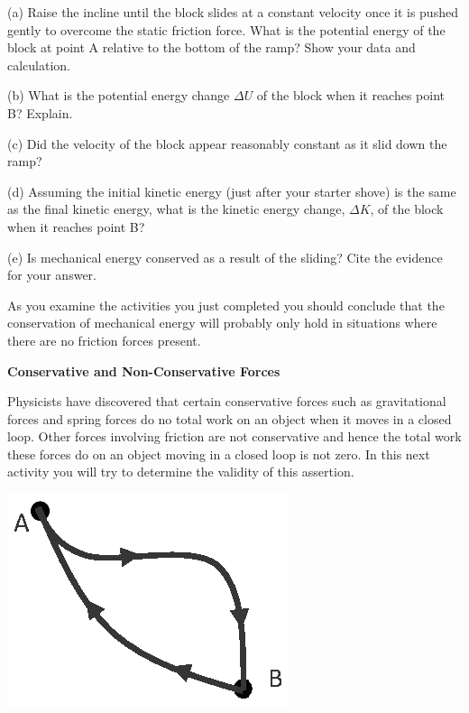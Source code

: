 (a) Raise the incline until the block slides at a constant velocity once it
is pushed gently to overcome the static friction force. What is the potential
energy of the block at point A relative to the bottom of the ramp? Show your
data and calculation.
\answerspace{35mm}


(b) What is the potential energy change $\Delta U$ of the block when it reaches point B? Explain.
\answerspace{20mm}

(c) Did the velocity of the block appear reasonably constant as it slid down the ramp?
\answerspace{15mm}

\pagebreak
(d) Assuming the initial kinetic energy (just after your starter shove) is the
same as the final kinetic energy, what is the kinetic energy change, $\Delta K$, of the block when it reaches point B? 
\answerspace{10mm}

(e) Is mechanical energy conserved as a result of the sliding? Cite the evidence for your answer.
\answerspace{20mm}

As you examine the activities you just completed you should conclude that the
conservation of mechanical energy will probably only hold in situations where
there are no friction forces present. 

\textbf{Conservative and Non-Conservative Forces} 

Physicists have discovered that certain conservative forces such as gravitational forces and spring forces do no total work on an object when it moves in a closed loop. Other forces involving friction are not conservative and hence the total work these forces do on an object moving in a closed loop is not zero. In this next activity you will try to determine the validity of this assertion.

{\par\centering \includegraphics{conservative/two_paths.eps} \par}


